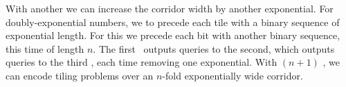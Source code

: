 With another \FFT we can increase the corridor width by another exponential.
For doubly-exponential numbers, we to precede each tile with a binary sequence of exponential length.
For this we precede each bit with another binary sequence, this time of length $n$.
The first \FFT\ outputs queries to the second, which outputs queries to the third \FFT, each time removing one exponential.
With $(n+1)$ \FFT, we can encode tiling problems over an $n$-fold exponentially wide corridor.










